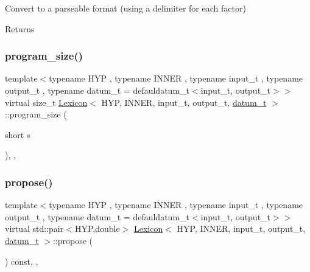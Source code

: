 Convert to a parseable format (using a delimiter for each factor) \begin{DoxyReturn}{Returns}

\end{DoxyReturn}
\mbox{\label{class_lexicon_a005225141f8a245fe33d8f0a58fd397a}} 
\subsubsection{\texorpdfstring{program\+\_\+size()}{program\_size()}}
{\footnotesize\ttfamily template$<$typename H\+YP , typename I\+N\+N\+ER , typename input\+\_\+t , typename output\+\_\+t , typename datum\+\_\+t  = defauldatum\+\_\+t$<$input\+\_\+t, output\+\_\+t$>$$>$ \\
virtual size\+\_\+t \hyperlink{class_lexicon}{Lexicon}$<$ H\+YP, I\+N\+N\+ER, input\+\_\+t, output\+\_\+t, \hyperlink{class_bayesable_a9f1a6c0cd7855550fa10b1a8f13a5867}{datum\+\_\+t} $>$\+::program\+\_\+size (\begin{DoxyParamCaption}\item[{short}]{s }\end{DoxyParamCaption})\hspace{0.3cm}{\ttfamily [inline]}, {\ttfamily [override]}, {\ttfamily [virtual]}}

\mbox{\label{class_lexicon_afa8ea51bbd16df5f46557fe10db84980}} 
\subsubsection{\texorpdfstring{propose()}{propose()}}
{\footnotesize\ttfamily template$<$typename H\+YP , typename I\+N\+N\+ER , typename input\+\_\+t , typename output\+\_\+t , typename datum\+\_\+t  = defauldatum\+\_\+t$<$input\+\_\+t, output\+\_\+t$>$$>$ \\
virtual std\+::pair$<$H\+YP,double$>$ \hyperlink{class_lexicon}{Lexicon}$<$ H\+YP, I\+N\+N\+ER, input\+\_\+t, output\+\_\+t, \hyperlink{class_bayesable_a9f1a6c0cd7855550fa10b1a8f13a5867}{datum\+\_\+t} $>$\+::propose (\begin{DoxyParamCaption}{ }\end{DoxyParamCaption}) const\hspace{0.3cm}{\ttfamily [inline]}, {\ttfamily [override]}, {\ttfamily [virtual]}}

